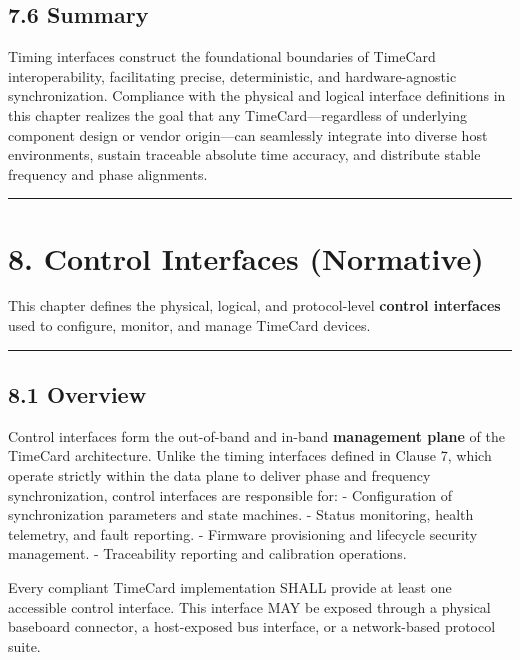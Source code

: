 \documentclass[
]{article}
\begin{document}
\subsection{7.6 Summary}\label{summary}

Timing interfaces construct the foundational boundaries of TimeCard
interoperability, facilitating precise, deterministic, and
hardware-agnostic synchronization. Compliance with the physical and
logical interface definitions in this chapter realizes the goal that any
TimeCard---regardless of underlying component design or vendor
origin---can seamlessly integrate into diverse host environments,
sustain traceable absolute time accuracy, and distribute stable
frequency and phase alignments.

\begin{center}\rule{0.5\linewidth}{0.5pt}\end{center}

\section{8. Control Interfaces
(Normative)}\label{control-interfaces-normative}

This chapter defines the physical, logical, and protocol-level
\textbf{control interfaces} used to configure, monitor, and manage
TimeCard devices.

\begin{center}\rule{0.5\linewidth}{0.5pt}\end{center}

\subsection{8.1 Overview}\label{overview-2}

Control interfaces form the out-of-band and in-band \textbf{management
plane} of the TimeCard architecture. Unlike the timing interfaces
defined in Clause 7, which operate strictly within the data plane to
deliver phase and frequency synchronization, control interfaces are
responsible for: - Configuration of synchronization parameters and state
machines. - Status monitoring, health telemetry, and fault reporting. -
Firmware provisioning and lifecycle security management. - Traceability
reporting and calibration operations.

Every compliant TimeCard implementation SHALL provide at least one
accessible control interface. This interface MAY be exposed through a
physical baseboard connector, a host-exposed bus interface, or a
network-based protocol suite.
\end{document}
